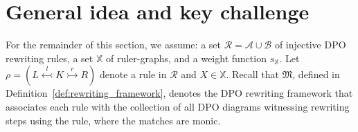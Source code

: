 \section{General idea and key challenge}
\label{subgraph_counting:sec:general_idea}
For the remainder of this section, we assume: a set \( \mathcal{R} \mathop{=} \mathcal{A} \mathop{\cup} \mathcal{B} \) of injective DPO rewriting rules, a set \( \mathbb{X} \) of ruler-graphs, and a weight function \( s_{\mathbb{X}} \).  Let \( \rho \mathop{=} (L \overset{l}{\leftarrowtail} K \overset{r}{\rightarrowtail} R) \) denote a rule in \( \mathcal{R} \) and \( X \mathop{\in} \mathbb{X} \). 
Recall that \(\mathfrak{M}\), defined in Definition~\ref{def:rewriting_framework}, denotes the DPO rewriting framework that associates each rule with the collection of all DPO diagrams witnessing rewriting steps using the rule, where the matches are monic.

